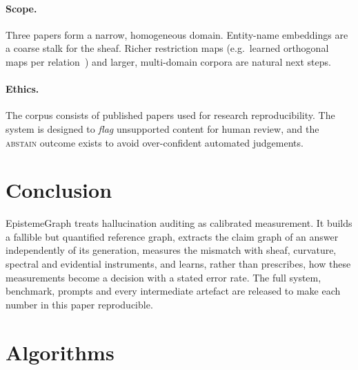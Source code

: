 \documentclass[10pt,twocolumn]{article}
\theoremstyle{remark}
\begin{document}
\paragraph{Scope.}
Three papers form a narrow, homogeneous domain. Entity-name embeddings are a coarse stalk for the sheaf. Richer
restriction maps (e.g.\ learned orthogonal maps per relation~\cite{gebhart2023knowledge}) and larger, multi-domain
corpora are natural next steps.

\paragraph{Ethics.}
The corpus consists of published papers used for research reproducibility. The system is designed to \emph{flag}
unsupported content for human review, and the \textsc{abstain} outcome exists to avoid over-confident automated
judgements.

\section{Conclusion}
\label{sec:conclusion}

EpistemeGraph treats hallucination auditing as calibrated measurement. It builds a fallible but quantified reference
graph, extracts the claim graph of an answer independently of its generation, measures the mismatch with sheaf,
curvature, spectral and evidential instruments, and learns, rather than prescribes, how these measurements become a
decision with a stated error rate. The full system, benchmark, prompts and every intermediate artefact are released
to make each number in this paper reproducible.




\appendix
\onecolumn
\section{Algorithms}
\label{app:alg}
\end{document}
